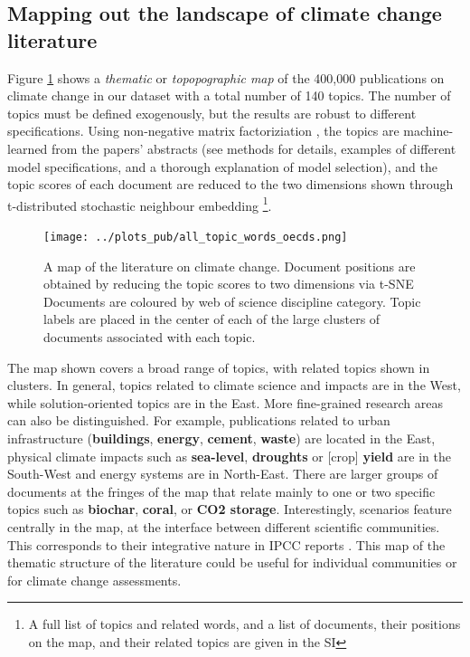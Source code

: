\documentclass{article}
\begin{document}
\begin{linenumbers}
		
		\subsection*{Mapping out the landscape of climate change literature}
		
		Figure \ref{oecd_topic_map} shows a \emph{thematic} or \emph{topopographic map} of the 400,000 publications on climate change in our dataset with a total number of 140 topics. The number of topics must be defined exogenously, but the results are robust to different specifications. Using non-negative matrix factoriziation \cite{Lee1999}, the topics are machine-learned from the papers' abstracts (see methods for details, examples of different model specifications, and a thorough explanation of model selection), and the topic scores of each document are reduced to the two dimensions shown through t-distributed stochastic neighbour embedding \cite{vandermaaten2008} \footnote{A full list of topics and related words, and a list of documents, their positions on the map, and their related topics are given in the SI}.
		
		
		\begin{figure}[htp]
			\begin{center}
				\texttt{[image: ../plots\_pub/all\_topic\_words\_oecds.png]}
				\caption{A map of the literature on climate change. Document positions are obtained by reducing the topic scores to two dimensions via t-SNE Documents are coloured by web of science discipline category. Topic labels are placed in the center of each of the large clusters of documents associated with each topic. }
				\label{oecd_topic_map}
			\end{center}
		\end{figure}
		
		
		
		The map shown covers a broad range of topics, with related topics shown in clusters. In general, topics related to climate science and impacts are in the West, while solution-oriented topics are in the East. More fine-grained research areas can also be distinguished. For example, publications related to urban infrastructure (\textbf{buildings}, \textbf{energy}, \textbf{cement}, \textbf{waste}) are located in the East, physical climate impacts such as \textbf{sea-level}, \textbf{droughts}  or [crop] \textbf{yield} are in the South-West and energy systems are in North-East. There are larger groups of documents at the fringes of the map that relate mainly to one or two specific topics such as \textbf{biochar}, \textbf{coral}, or \textbf{CO2 storage}. Interestingly, scenarios feature centrally in the map, at the interface between different scientific communities. This corresponds to their integrative nature in IPCC reports \cite{Moss2010}. This map of the thematic structure of the literature could be useful for individual communities or for climate change assessments.
		

\end{linenumbers}
\end{document}
